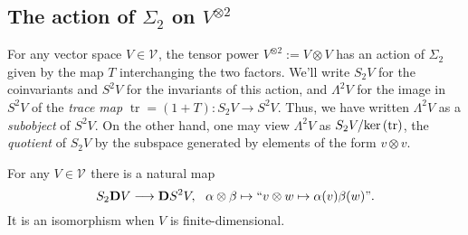 \documentclass[11pt]{amsart}
\theoremstyle{plain}
\theoremstyle{definition}
\renewcommand{\ker}{\textup{ker}\,}
\DeclareMathOperator{\trace}{tr}
\renewcommand{\to}{\longrightarrow}
\newcommand{\calV}{\mathcal{V}}
\theoremstyle{plain}
\newcommand{\vect}[2]{\calV^{#1}_{#2}}
\newcommand{\dual}{\mathbf{D}}
\begin{document}
\begin{Conventions and notation}
\subsection{The action of $\Sigma_2$ on $V^{\otimes 2}$}
For any vector space $V\in \vect{}{}$, the tensor power $V^{\otimes2}:=V\otimes V$ has an action of $\Sigma_2$ given by the map $T$ interchanging the two factors. We'll write $S_2V$ for the coinvariants and $S^2V$ for the invariants of this action, and $\Lambda^2V$ for the image in $S^2V$ of the \emph{trace map} $\trace=(1+T):S_2V\to S^2V$. Thus, we have written $\Lambda^2V$ as a \emph{subobject} of $S^2V$.
On the other hand, one may view $\Lambda^2V$ as $S_2V/\ker(\trace)$,  the \emph{quotient} of $S_2V$ by the subspace generated by elements of the form $v\otimes v$. %

For any $V\in \vect{}{}$ there is a natural map
\[S_2\dual V\to \dual S^2V,\ \ \alpha\otimes \beta\mapsto\textup{``$v\otimes w\mapsto \alpha(v)\beta(w)$''}.\]
It is an isomorphism when $V$ is finite-dimensional.


\end{Conventions and notation}
\end{document}
